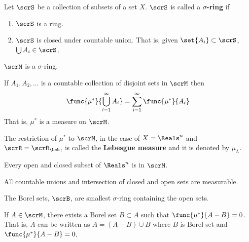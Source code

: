 \begin{definition}
    Let \(\scrS\) be a collection of subsets of a set \(X\). \(\scrS\) is called a \textbf{\(\sigma\)-ring} if
    \begin{enumerate}
        \item \(\scrS\) is a ring.
        \item \(\scrS\) is closed under countable union. That is, given \(\set{A_i} \subset \scrS\), \(\bigcup A_i \in \scrS\).
    \end{enumerate} 
\end{definition}

\begin{theorem}
    \(\scrM\) is a \(\sigma\)-ring.
\end{theorem}

\begin{theorem}
    If \(A_1,A_2, \dots \) is a countable collection of disjoint sets in \(\scrM\) then 
    \begin{equation*}
        \func{\mu^{\ast}}{\bigcup_{i = 1}^{\infty} A_i} = \sum_{i = 1}^{\infty} \func{\mu^{\ast}}{A_i}
    \end{equation*}
    That is, \(\mu^{\ast}\) is a measure on \(\scrM\).
\end{theorem}

\begin{example}
    The restriction of \(\mu^{\ast}\) to \(\scrM\), in the case of \(X = \Reals^n\) and \(\scrR = \scrR_{\Leb}\), is called the \textbf{Lebesgue measure} and it is denoted by \(\mu_L\).
\end{example}

\begin{proposition}
    Every open and closed subset of \(\Reals^n\) is in \(\scrM\).
\end{proposition}

\begin{corollary}
    All countable unions and intersection of closed and open sets are measurable.
\end{corollary}

\begin{definition}
    The Borel sets, \(\scrB\), are smallest \(\sigma\)-ring containing the open sets.
\end{definition}

\begin{theorem}
    If \(A \in \scrM\), there exists a Borel set \(B \subset A\) such that \(\func{\mu^{\ast}}{A - B} =0\). That is, \(A\) can be written as \(A = (A - B) \cup B\) where \(B\) is Borel set and \(\func{\mu^{\ast}}{A - B} = 0\).
\end{theorem}

